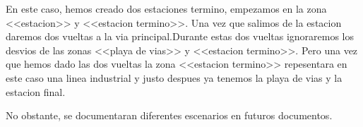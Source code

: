 En este caso, hemos creado dos estaciones termino, empezamos en la zona <<estacion>> y <<estacion termino>>. Una vez que salimos de la estacion daremos dos vueltas a la via principal.Durante estas dos vueltas ignoraremos los desvios de las zonas <<playa de vias>> y <<estacion termino>>. Pero una vez que hemos dado las dos vueltas la zona <<estacion termino>> repesentara en este caso una linea industrial y justo despues ya tenemos la playa de vias y la estacion final.

No obstante, se documentaran diferentes escenarios en futuros documentos.

